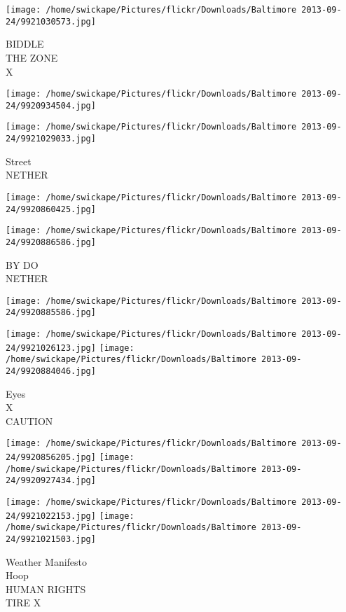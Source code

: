 \documentclass[10pt,letterpaper]{article}
\begin{document}
\texttt{[image: /home/swickape/Pictures/flickr/Downloads/Baltimore 2013-09-24/9921030573.jpg]}

BIDDLE\\
THE ZONE\\
X
\pagebreak

\texttt{[image: /home/swickape/Pictures/flickr/Downloads/Baltimore 2013-09-24/9920934504.jpg]}

\vspace{0.25in}
\texttt{[image: /home/swickape/Pictures/flickr/Downloads/Baltimore 2013-09-24/9921029033.jpg]}

Street\\
NETHER
\pagebreak

\texttt{[image: /home/swickape/Pictures/flickr/Downloads/Baltimore 2013-09-24/9920860425.jpg]}

\vspace{0.25in}
\texttt{[image: /home/swickape/Pictures/flickr/Downloads/Baltimore 2013-09-24/9920886586.jpg]}

BY DO\\
NETHER
\pagebreak

\texttt{[image: /home/swickape/Pictures/flickr/Downloads/Baltimore 2013-09-24/9920885586.jpg]}

\vspace{0.25in}
\texttt{[image: /home/swickape/Pictures/flickr/Downloads/Baltimore 2013-09-24/9921026123.jpg]}
\texttt{[image: /home/swickape/Pictures/flickr/Downloads/Baltimore 2013-09-24/9920884046.jpg]}

Eyes\\
X\\
CAUTION
\pagebreak

\texttt{[image: /home/swickape/Pictures/flickr/Downloads/Baltimore 2013-09-24/9920856205.jpg]}
\texttt{[image: /home/swickape/Pictures/flickr/Downloads/Baltimore 2013-09-24/9920927434.jpg]}

\texttt{[image: /home/swickape/Pictures/flickr/Downloads/Baltimore 2013-09-24/9921022153.jpg]}
\texttt{[image: /home/swickape/Pictures/flickr/Downloads/Baltimore 2013-09-24/9921021503.jpg]}

Weather Manifesto\\
Hoop\\
HUMAN RIGHTS\\
TIRE X
\pagebreak
\end{document}
